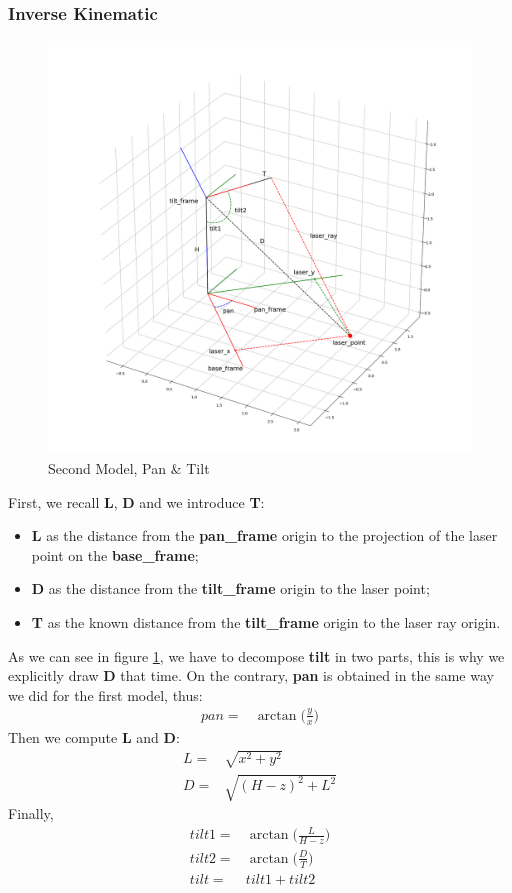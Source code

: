 \subsubsection{Inverse Kinematic}
\begin{figure}
	\centering
	\includegraphics[width=\textwidth]{img/model2XY.png}%
	\caption{Second Model, Pan \& Tilt}
	\label{fig:secondModelPanTilt}
\end{figure}
First, we recall \textbf{L}, \textbf{D} and we introduce \textbf{T}:
\begin{itemize}
    \item \textbf{L} as the distance from the \textbf{pan\_frame} origin to the projection of the laser point on the \textbf{base\_frame};
    \item \textbf{D} as the distance from the \textbf{tilt\_frame} origin to the laser point;
    \item \textbf{T} as the known distance from the \textbf{tilt\_frame} origin to the laser ray origin.
\end{itemize}
As we can see in figure \ref{fig:secondModelPanTilt}, we have to decompose \textbf{tilt} in two parts, this is why we explicitly draw \textbf{D} that time. On the contrary, \textbf{pan} is obtained in the same way we did for the first model, thus:
\begin{align}
	pan=& \arctan\bigg(\frac{y}{x}\bigg)\label{eq:panik2}
\end{align}
Then we compute \textbf{L} and \textbf{D}:
\begin{align}
	L=& \sqrt{x^2+y^2}\\
	D=& \sqrt{(H-z)^2 + L^2}
\end{align}
Finally,
\begin{align}
	tilt1 =& \arctan\bigg(\frac{L}{H-z}\bigg)\\
	tilt2 =& \arctan\bigg(\frac{D}{T}\bigg)\\
	tilt =& tilt1 + tilt2
\end{align}
\\
